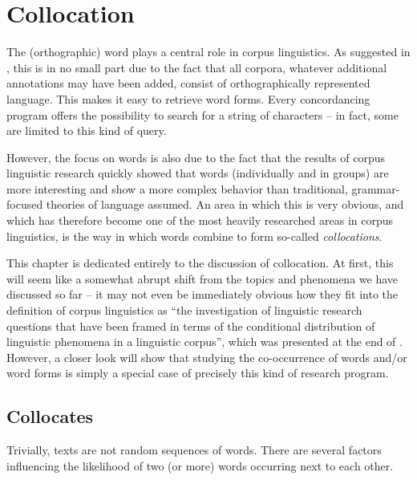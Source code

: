 \chapter{Collocation}\label{ch:collocation}\largerpage

The (orthographic) word plays a central role in corpus linguistics. As suggested in , this is in no small part due to the fact that all corpora, whatever additional annotations  may have been added, consist of orthographically represented language. This makes it easy to retrieve  word forms. Every concordancing  program offers the possibility to search for a string of characters -- in fact, some are limited to this kind of  query.

However, the focus on words is also due to the fact that the results of corpus linguistic research quickly showed that words (individually and in groups) are more interesting and show a more complex behavior than traditional, grammar\hyp{}focused  theories of language assumed. An area in which this is very obvious, and which has therefore become one of the most heavily researched areas in corpus linguistics, is the way in which words combine to form so\hyp{}called  \textit{collocations}.

This chapter is dedicated entirely to the discussion of collocation.  At first, this will seem like a somewhat abrupt shift from the topics and phenomena we have discussed so far -- it may not even be immediately obvious how they fit into the definition of corpus linguistics as ``the investigation of linguistic research questions that have been framed in terms of the conditional distribution  of linguistic phenomena in a linguistic corpus'', which was presented at the end of . However, a closer look will show that studying the co\hyp{}occurrence of words and\slash or word forms is simply a special case of precisely this kind of research program.

\section{Collocates}
\label{sec:collocates}

Trivially, texts are not random  sequences of words. There are several factors influencing the likelihood  of two (or more) words occurring next to each other.

